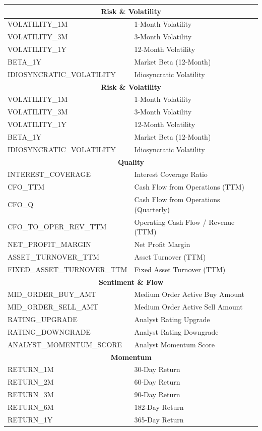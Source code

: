 \documentclass{article}
\begin{document}
\begin{longtable}{@{}ll@{}}
\midrule
\multicolumn{2}{c}{\textbf{Risk \& Volatility}} \\
\midrule
VOLATILITY\_1M & 1-Month Volatility \\
VOLATILITY\_3M & 3-Month Volatility \\
VOLATILITY\_1Y & 12-Month Volatility \\
BETA\_1Y & Market Beta (12-Month) \\
IDIOSYNCRATIC\_VOLATILITY & Idiosyncratic Volatility \\
\midrule
\multicolumn{2}{c}{\textbf{Risk \& Volatility}} \\
\midrule
VOLATILITY\_1M & 1-Month Volatility \\
VOLATILITY\_3M & 3-Month Volatility \\
VOLATILITY\_1Y & 12-Month Volatility \\
BETA\_1Y & Market Beta (12-Month) \\
IDIOSYNCRATIC\_VOLATILITY & Idiosyncratic Volatility \\
\midrule
\multicolumn{2}{c}{\textbf{Quality}} \\
\midrule
INTEREST\_COVERAGE & Interest Coverage Ratio \\
CFO\_TTM & Cash Flow from Operations (TTM) \\
CFO\_Q & Cash Flow from Operations (Quarterly) \\
CFO\_TO\_OPER\_REV\_TTM & Operating Cash Flow / Revenue (TTM) \\
NET\_PROFIT\_MARGIN & Net Profit Margin \\
ASSET\_TURNOVER\_TTM & Asset Turnover (TTM) \\
FIXED\_ASSET\_TURNOVER\_TTM & Fixed Asset Turnover (TTM) \\
\midrule
\multicolumn{2}{c}{\textbf{Sentiment \& Flow}} \\
\midrule
MID\_ORDER\_BUY\_AMT & Medium Order Active Buy Amount \\
MID\_ORDER\_SELL\_AMT & Medium Order Active Sell Amount \\
RATING\_UPGRADE & Analyst Rating Upgrade \\
RATING\_DOWNGRADE & Analyst Rating Downgrade \\
ANALYST\_MOMENTUM\_SCORE & Analyst Momentum Score \\
\midrule
\multicolumn{2}{c}{\textbf{Momentum}} \\
\midrule
RETURN\_1M & 30-Day Return \\
RETURN\_2M & 60-Day Return \\
RETURN\_3M & 90-Day Return \\
RETURN\_6M & 182-Day Return \\
RETURN\_1Y & 365-Day Return \\

\bottomrule
\end{longtable}
\end{document}
